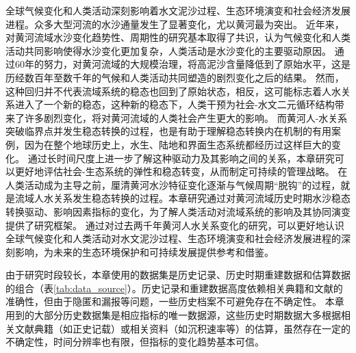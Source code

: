 全球气候变化和人类活动深刻影响着水文泥沙过程、生态环境演变和社会经济发展进程。众多大型河流的水沙通量发生了显著变化，尤以黄河最为突出\cite{best2019, best2020}。
近年来，对黄河流域水沙变化趋势性、周期性的研究基本取得了共识，认为气候变化和人类活动共同影响使得水沙变化更加复杂，人类活动是水沙变化的主要驱动原因\cite{wang2016a, ma2020}。
通过$60$年的努力，对黄河流域的大规模治理，将高泥沙含量降低到了原始水平，这是历经数百年至数千年的气候和人类活动共同塑造的剧烈变化之后的结果\cite{wang2016e, ji2018}。
然而，这种回归并不代表流域系统的稳态也回到了原始状态，相反，这可能标志着人水关系进入了一个新的稳态，这种新的稳态下，人类干预为社会-水文二元循环结构带来了许多剧烈变化，将对黄河流域的人类社会产生更大的影响。
而黄河人-水关系突破临界点并发生稳态转换的过程，也是有助于理解稳态转换内在机制的有用案例，因为在整个地球历史上，水生、陆地和界面生态系统都经历过这样巨大的变化\cite{hughes2013, rocha2018}。
通过长时间尺度上进一步了解这种驱动力及其影响之间的关系，本章研究可以更好地评估社会-生态系统的弹性和稳态转变，从而制定可持续的管理战略\cite{scheffer2003}。
在人类活动成为主导之前，厘清黄河水沙特征变化逐渐与气候周期“脱钩”的过程，就是流域人水关系发生稳态转换的过程。本章研究通过对黄河流域历史时期水沙稳态转换驱动、影响因素指标的变化，为了解人类活动对流域系统的影响及其协同演变提供了研究框架。
通过对过去两千年黄河人水关系变化的研究，可以更好地认识全球气候变化和人类活动对水文泥沙过程、生态环境演变和社会经济发展进程的深刻影响，为未来的生态环境保护和可持续发展提供参考和借鉴。

由于研究时段较长，本章使用的数据集是历史记录、历史时期重建数据和估算数据的组合（表\ref{tab:data_source}）。历史记录和重建数据高度依赖相关典籍和文献的准确性，但由于隐匿和漏报等问题，一些历史档案不可避免存在不确定性\cite{wu2020a}。
本章用到的大部分历史数据集是相应指标的唯一数据源，这些历史时期数据大多根据相关文献典籍（如正史记载）或相关资料（如沉积速率等）的估算，虽然存在一定的不确定性，时间分辨率也有限，但指标的变化趋势基本可信。
